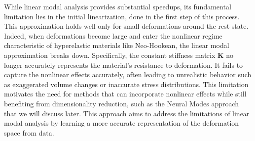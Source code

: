 While linear modal analysis provides substantial speedups, its fundamental limitation lies in the initial linearization, done in the first step of this process. This approximation holds well only for small deformations around the rest state. Indeed, when deformations become large and enter the nonlinear regime characteristic of hyperelastic materials like Neo-Hookean, the linear modal approximation breaks down. Specifically, the constant stiffness matrix $\bm{K}$ no longer accurately represents the material's resistance to deformation. It fails to capture the nonlinear effects accurately, often leading to unrealistic behavior such as exaggerated volume changes or inaccurate stress distributions. This limitation motivates the need for methods that can incorporate nonlinear effects while still benefiting from dimensionality reduction, such as the Neural Modes approach that we will discuss later. This approach aims to address the limitations of linear modal analysis by learning a more accurate representation of the deformation space from data.
